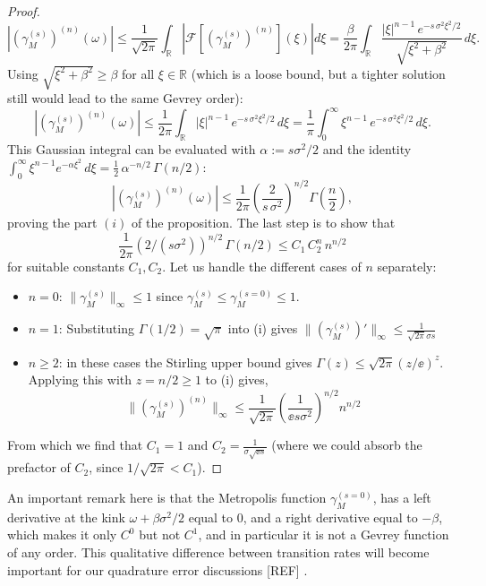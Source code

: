 \begin{proof}
    \[
    \left|(\gamma_M^{(s)})^{(n)}(\omega)\right| \leq \frac{1}{\sqrt{2\pi}} \int_{\mathbb{R}} \left|\mathcal{F}[(\gamma_M^{(s)})^{(n)}](\xi)\right| d\xi = \frac{\beta}{2\pi} \int_{\mathbb{R}} \frac{|\xi|^{n-1}\, e^{-s\,\sigma^2\xi^2/2}}{\sqrt{\xi^2 + \beta^2}}\, d\xi.
    \]
    Using $\sqrt{\xi^2 + \beta^2} \geq \beta$ for all $\xi\in\mathbb{R}$ (which is a loose bound, but a tighter solution still would lead to the same Gevrey order):
    \[
    \left|(\gamma_M^{(s)})^{(n)}(\omega)\right| \leq \frac{1}{2\pi} \int_{\mathbb{R}} |\xi|^{n-1}\, e^{-s\,\sigma^2\xi^2/2}\, d\xi = \frac{1}{\pi} \int_0^\infty \xi^{n-1}\, e^{-s\,\sigma^2\xi^2/2}\, d\xi.
    \]
    This Gaussian integral can be evaluated with $\alpha := s \sigma^2 / 2$ and the identity $\int_0^\infty \xi^{n-1} e^{-\alpha \xi^2}\, d\xi = \frac{1}{2}\,\alpha^{-n/2}\,\Gamma(n/2)$:
    \[
    \left|\left(\gamma_M^{(s)}\right)^{(n)}(\omega)\right| \leq \frac{1}{2\pi}\left(\frac{2}{s\,\sigma^2}\right)^{n/2} \Gamma\!\left(\frac{n}{2}\right),
    \] 
    proving the part $(i)$ of the proposition.
    The last step is to show that 
    \[
    \frac{1}{2\pi}(2/(s\sigma^2))^{n/2}\,\Gamma(n/2) \leq C_1\, C_2^n\, n^{n/2}
    \]
    for suitable constants $C_1, C_2$. Let us handle the different cases of $n$ separately: 
    \begin{itemize}
        \item $n = 0$: $\|\gamma_M^{(s)}\|_\infty \leq 1$ since $\gamma_M^{(s)} \leq \gamma_M^{(s=0)} \leq 1$.
        \item $n = 1$: Substituting $\Gamma(1 / 2) = \sqrt{\pi}$ into (i) gives $\| (\gamma_M^{(s)})'\|_\infty \leq \frac{1}{\sqrt{2\pi} \sigma s}$ 
        \item $n \geq 2$: in these cases the Stirling upper bound gives $\Gamma(z) \leq \sqrt{2\pi} (z / \ee)^z$. Applying this with $z = n /2 \geq 1$ to (i) gives, 
        \[
        \| (\gamma_M^{(s)})^{(n)}\|_\infty \leq \frac{1}{\sqrt{2\pi}}\left(\frac{1}{\ee s \sigma^2}\right)^{n / 2} n^{n / 2}
        \]
    \end{itemize}
    From which we find that $C_1 = 1$ and $C_2 = \frac{1}{\sigma \sqrt{\ee s}}$ (where we could absorb the prefactor of $C_2$, since $1 / \sqrt{2\pi} < C_1$).
\end{proof}
\noindent An important remark here is that the Metropolis function $\gamma_M^{(s = 0)}$, has a left derivative at the kink $\omega + \beta\sigma^2 / 2$ equal to $0$, and a right derivative equal to $-\beta$, which makes it only $C^0$ but not $C^1$, and in particular it is not a Gevrey function of any order. This qualitative difference between transition rates will become important for our quadrature error discussions [REF] .


